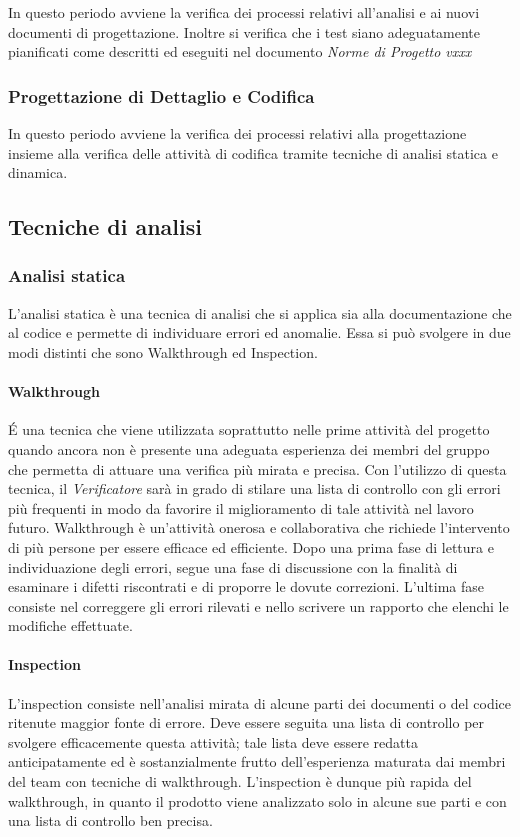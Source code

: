 In questo periodo avviene la verifica dei processi relativi all'analisi e
ai nuovi documenti di progettazione. Inoltre si verifica che i test
siano adeguatamente pianificati come descritti ed eseguiti nel documento \emph{Norme
  di Progetto vxxx}

\subsubsection{Progettazione di Dettaglio e Codifica}

In questo periodo avviene la verifica dei processi relativi alla
progettazione insieme alla verifica delle attività di codifica tramite
tecniche di analisi statica e dinamica.



\subsection{Tecniche di analisi}

\subsubsection{Analisi statica}
L'analisi statica è una tecnica di analisi che si applica sia alla
documentazione che al codice e permette di individuare errori ed
anomalie. Essa si può svolgere in due modi distinti che sono Walkthrough ed
Inspection.

\paragraph{Walkthrough}
\'E una tecnica che viene utilizzata soprattutto nelle prime attività
del progetto quando ancora non è presente una adeguata esperienza dei
membri del gruppo che permetta di attuare una verifica più
mirata e precisa.
Con l'utilizzo di questa tecnica, il \emph{Verificatore} sarà in grado
di stilare una lista di controllo con gli errori più frequenti in modo
da favorire il miglioramento di tale attività nel lavoro futuro.
Walkthrough è un'attività onerosa e collaborativa che richiede
l'intervento di più persone per essere efficace ed efficiente. Dopo
una prima fase di lettura e individuazione degli errori, segue una
fase di discussione con la finalità di esaminare i difetti riscontrati
e di proporre le dovute correzioni. L'ultima fase consiste nel
correggere gli errori rilevati e nello scrivere un rapporto che
elenchi le modifiche effettuate.


\paragraph{Inspection}
L’inspection consiste nell'analisi mirata di alcune parti dei
documenti o del codice ritenute maggior fonte di errore. Deve essere
seguita una lista di controllo per svolgere efficacemente questa
attività; tale lista deve essere redatta anticipatamente ed è
sostanzialmente frutto dell'esperienza maturata dai membri del team
con tecniche di walkthrough. L’inspection è dunque più rapida del
walkthrough, in quanto il prodotto viene analizzato solo in alcune
sue parti e con una lista di controllo ben precisa.

